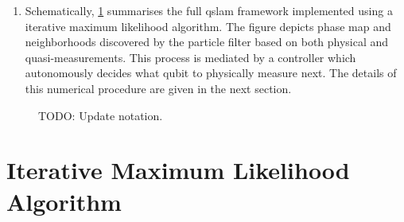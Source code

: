 \begin{enumerate}
\item 	Schematically, \cref{fig_intro_highlevel_ver_2_3} summarises the full qslam framework implemented using a iterative maximum likelihood algorithm. The figure depicts phase map and neighborhoods discovered by the particle filter based on both physical and quasi-measurements. This process is mediated by a controller which autonomously decides what qubit to physically measure next. The details of this numerical procedure are given in the next section. 
\end{enumerate}
\begin{widetext}
	\begin{figure}[]
		\caption{\label{fig_intro_highlevel_ver_2_3} TODO: Update notation.}    	
	\end{figure}
\end{widetext}

\section{Iterative Maximum Likelihood Algorithm}

